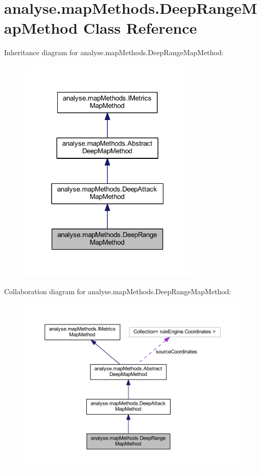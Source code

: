 \hypertarget{classanalyse_1_1map_methods_1_1_deep_range_map_method}{}\section{analyse.\+map\+Methods.\+Deep\+Range\+Map\+Method Class Reference}
\label{classanalyse_1_1map_methods_1_1_deep_range_map_method}


Inheritance diagram for analyse.\+map\+Methods.\+Deep\+Range\+Map\+Method\+:
\nopagebreak
\begin{figure}[H]
\begin{center}
\leavevmode
\includegraphics[width=244pt]{classanalyse_1_1map_methods_1_1_deep_range_map_method__inherit__graph}
\end{center}
\end{figure}


Collaboration diagram for analyse.\+map\+Methods.\+Deep\+Range\+Map\+Method\+:
\nopagebreak
\begin{figure}[H]
\begin{center}
\leavevmode
\includegraphics[width=350pt]{classanalyse_1_1map_methods_1_1_deep_range_map_method__coll__graph}
\end{center}
\end{figure}

